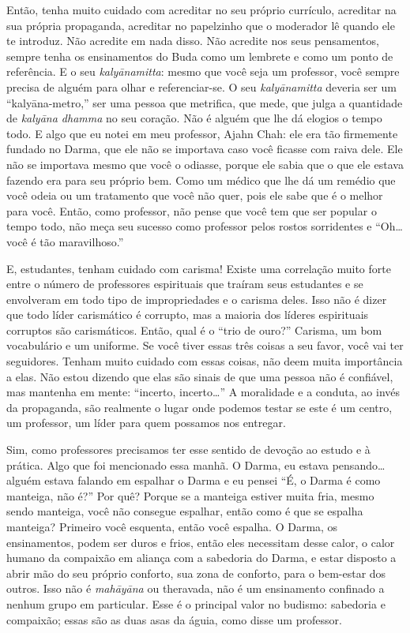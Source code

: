 Então, tenha muito cuidado com acreditar no seu próprio currículo,
acreditar na sua própria propaganda, acreditar no papelzinho que o
moderador lê quando ele te introduz. Não acredite em nada disso. Não
acredite nos seus pensamentos, sempre tenha os ensinamentos do Buda
como um lembrete e como um ponto de referência. E o seu
\emph{kalyānamitta}: mesmo que você seja um professor, você sempre
precisa de alguém para olhar e referenciar-se. O seu
\emph{kalyānamitta} deveria ser um “kalyāna-metro,” ser uma
pessoa que metrifica, que mede, que julga a quantidade de
\emph{kalyāna dhamma} no seu coração. Não é alguém que lhe dá
elogios o tempo todo. E algo que eu notei em meu professor, Ajahn Chah:
ele era tão firmemente fundado no Darma, que ele não se importava caso
você ficasse com raiva dele. Ele não se importava mesmo que você o
odiasse, porque ele sabia que o que ele estava fazendo era para seu
próprio bem. Como um médico que lhe dá um remédio que você odeia ou um
tratamento que você não quer, pois ele sabe que é o melhor para você.
Então, como professor, não pense que você tem que ser popular o tempo
todo, não meça seu sucesso como professor pelos rostos sorridentes e
“Oh\ldots{} você é tão maravilhoso.” 

E, estudantes, tenham cuidado com carisma! Existe uma correlação
muito forte entre o número de professores espirituais que traíram seus
estudantes e se envolveram em todo tipo de impropriedades e o carisma
deles. Isso não é dizer que todo líder carismático é corrupto, mas a
maioria dos líderes espirituais corruptos são carismáticos. Então, qual
é o “trio de ouro?” Carisma, um bom vocabulário e um uniforme. Se você
tiver essas três coisas a seu favor, você vai ter seguidores. Tenham
muito cuidado com essas coisas, não deem muita importância a elas. Não
estou dizendo que elas são sinais de que uma pessoa não é confiável,
mas mantenha em mente: “incerto, incerto\ldots{}” A moralidade e a conduta, ao
invés da propaganda, são realmente o lugar onde podemos testar se este
é um centro, um professor, um líder para quem possamos nos entregar. 

Sim, como professores precisamos ter esse sentido de devoção ao
estudo e à prática. Algo que foi mencionado essa manhã. O Darma, eu
estava pensando\ldots{} alguém estava falando em espalhar o Darma e eu pensei
“É, o Darma é como manteiga, não é?” Por quê? Porque se a manteiga
estiver muita fria, mesmo sendo manteiga, você não consegue espalhar,
então como é que se espalha manteiga? Primeiro você esquenta, então
você espalha. O Darma, os ensinamentos, podem ser duros e frios, então
eles necessitam desse calor, o calor humano da compaixão em aliança com
a sabedoria do Darma, e estar disposto a abrir mão do seu próprio
conforto, sua zona de conforto, para o bem-estar dos outros. Isso não é
\emph{mahāyāna} ou theravada, não é um ensinamento confinado a
nenhum grupo em particular. Esse é o principal valor no budismo:
sabedoria e compaixão; essas são as duas asas da águia, como disse um
professor. 


